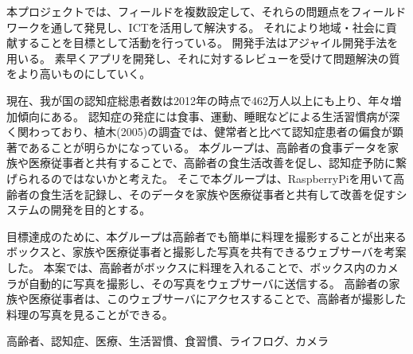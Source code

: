 \documentclass[../report]{subfiles}
\begin{document}
\begin{jabstract}
本プロジェクトでは、フィールドを複数設定して、それらの問題点をフィールドワークを通して発見し、ICTを活用して解決する。
それにより地域・社会に貢献することを目標として活動を行っている。
開発手法はアジャイル開発手法を用いる。
素早くアプリを開発し、それに対するレビューを受けて問題解決の質をより高いものにしていく。

現在、我が国の認知症総患者数は2012年の時点で462万人以上にも上り、年々増加傾向にある\cite{zouka}。
認知症の発症には食事、運動、睡眠などによる生活習慣病が深く関わっており、植木(2005)の調査では、健常者と比べて認知症患者の偏食が顕著であることが明らかになっている\cite{ueki}。
本グループは、高齢者の食事データを家族や医療従事者と共有することで、高齢者の食生活改善を促し、認知症予防に繋げられるのではないかと考えた。
そこで本グループは、RaspberryPiを用いて高齢者の食生活を記録し、そのデータを家族や医療従事者と共有して改善を促すシステムの開発を目的とする。

目標達成のために、本グループは高齢者でも簡単に料理を撮影することが出来るボックスと、家族や医療従事者と撮影した写真を共有できるウェブサーバを考案した。
本案では、高齢者がボックスに料理を入れることで、ボックス内のカメラが自動的に写真を撮影し、その写真をウェブサーバに送信する。
高齢者の家族や医療従事者は、このウェブサーバにアクセスすることで、高齢者が撮影した料理の写真を見ることができる。
\begin{jkeyword}
高齢者、認知症、医療、生活習慣、食習慣、ライフログ、カメラ
\end{jkeyword}
\end{jabstract}
\end{document}
